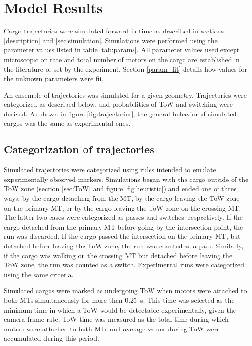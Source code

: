 \section{Model Results} \label{sec:results}

Cargo trajectories were simulated forward in time as described in sections \ref{description} and \ref{sec:simulation}. Simulations were performed using the parameter values listed in table \ref{tab:params}. All parameter values used except microscopic on rate and total number of motors on the cargo are established in the literature or set by the experiment. Section \ref{param_fit} details how values for the unknown parameters were fit.

An ensemble of trajectories was simulated for a given geometry. Trajectories were categorized as described below, and probabilities of ToW and switching were derived. As shown in figure \ref{fig:trajectories}, the general behavior of simulated cargos was the same as experimental ones.

\subsection{Categorization of trajectories} \label{sec:rules}

Simulated trajectories were categorized using rules intended to emulate experimentally observed markers. Simulations began with the cargo outside of the ToW zone (section \ref{sec:ToW} and figure \ref{fig:heuristic}) and ended one of three ways: by the cargo detaching from the MT, by the cargo leaving the ToW zone on the primary MT, or by the cargo leaving the ToW zone on the crossing MT. The latter two cases were categorized as passes and switches, respectively. If the cargo detached from the primary MT before going by the intersection point, the run was discarded. If the cargo passed the intersection on the primary MT, but detached before leaving the ToW zone, the run was counted as a pass. Similarly, if the cargo was walking on the crossing MT but detached before leaving the ToW zone, the run was counted as a switch. Experimental runs were categorized using the same criteria.

Simulated cargos were marked as undergoing ToW when motors were attached to both MTs simultaneously for more than \SI{.25}{\second}. This time was selected as the minimum time in which a ToW would be detectable experimentally, given the camera frame rate. ToW time was measured as the total time during which motors were attached to both MTs and average values during ToW were accumulated during this period.

